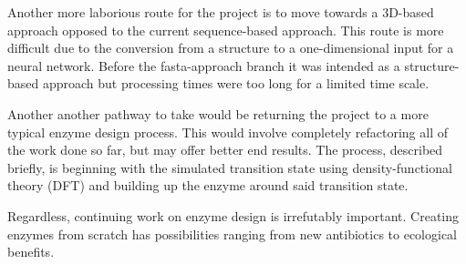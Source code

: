 \documentclass[12pt]{article}
\begin{document}
Another more laborious route for the project is to move towards a 3D-based approach
opposed to the current sequence-based approach. This route is more difficult due
to the conversion from a structure to a one-dimensional input for a neural network.
Before the fasta-approach branch it was intended as a structure-based approach but
processing times were too long for a limited time scale.

Another another pathway to take would be returning the project to a more typical
enzyme design process. This would involve completely refactoring all of the work
done so far, but may offer better end results. The process, described briefly, is
beginning with the simulated transition state using density-functional theory (DFT)
and building up the enzyme around said transition state.

Regardless, continuing work on enzyme design is irrefutably important. Creating
enzymes from scratch has possibilities ranging from new antibiotics to ecological
benefits. 
\end{document}

